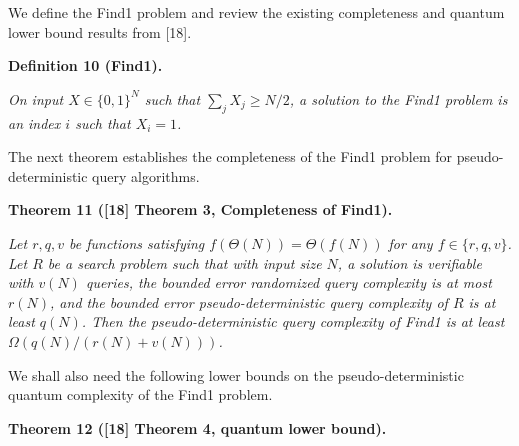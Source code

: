\documentclass[10pt,a4paper]{article}
\begin{document}
We define the Find1 problem and review the existing completeness and quantum lower bound results from [18].\par





\par\medskip\noindent\textbf{
\textbf{Definition 10}\textbf{ }(Find1)\textbf{.}
}\par



\emph{On input $X\in\{0,1\}^{N}$ such that $\sum_{j}X_{j}\geq N/2$, a solution to the Find1 problem is an index $i$ such that $X_{i}=1$.}\par






The next theorem establishes the completeness of the Find1 problem for pseudo-deterministic query algorithms.\par





\par\medskip\noindent\textbf{
\textbf{Theorem 11}\textbf{ }([18] Theorem 3, Completeness of Find1)\textbf{.}
}\par



\emph{Let $r,q,v$ be functions satisfying $f(\Theta(N))=\Theta(f(N))$ for any $f\in\{r,q,v\}$.
Let ${R}$ be a search problem such that with input size $N$, a solution is verifiable with $v(N)$ queries, the bounded error randomized query complexity is at most $r(N)$, and the bounded error pseudo-deterministic query complexity of ${R}$ is at least $q(N)$. Then the pseudo-deterministic query complexity of Find1 is at least $\Omega(q(N)/(r(N)+v(N)))$.}\par






We shall also need the following lower bounds on the pseudo-deterministic quantum complexity of the Find1 problem.\par





\par\medskip\noindent\textbf{
\textbf{Theorem 12}\textbf{ }([18] Theorem 4, quantum lower bound)\textbf{.}
}\par
\end{document}

